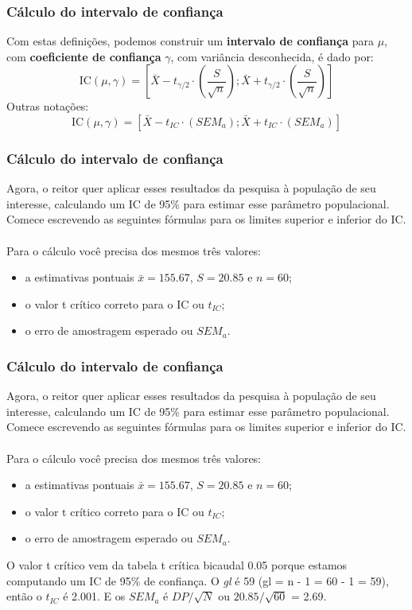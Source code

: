 \documentclass[11pt]{beamer}
\begin{document}
\begin{frame}
\frametitle{Cálculo do intervalo de confiança}

Com estas definições, podemos construir um \textbf{intervalo de
confiança} para \(\mu\), com \textbf{coeficiente de confiança}
\(\gamma\), com variância desconhecida, é dado por: \[
\text{IC}(\mu, \gamma) = \left[ \bar{X} - t_{\gamma/2} \cdot
  \left(\frac{S}{\sqrt{n}}\right) ; \bar{X} + t_{\gamma/2} \cdot
  \left(\frac{S}{\sqrt{n}}\right)  \right]
\]
Outras notações:
\[\text{IC}(\mu, \gamma) = \left[ \bar{X} - t_{IC} \cdot
  \left(SEM_a\right) ; \bar{X} + t_{IC} \cdot
  \left(SEM_a\right)  \right]
\]
\end{frame}

\begin{frame}
\frametitle{Cálculo do intervalo de confiança}

Agora, o reitor quer aplicar esses resultados da pesquisa à população de seu interesse, calculando um IC de 95\% para estimar esse parâmetro populacional. Comece escrevendo as seguintes fórmulas para os limites superior e inferior do IC.\\~\\

Para o cálculo você precisa dos mesmos três valores: 
\begin{itemize}
\item a estimativas pontuais $\bar{x}=155.67$, $S=20.85$ e $n=60$;
\item o valor t crítico correto para o IC ou $t_{IC}$;
\item o erro de amostragem esperado ou $SEM_a$.
\end{itemize}


\end{frame}

\begin{frame}
\frametitle{Cálculo do intervalo de confiança}

Agora, o reitor quer aplicar esses resultados da pesquisa à população de seu interesse, calculando um IC de 95\% para estimar esse parâmetro populacional. Comece escrevendo as seguintes fórmulas para os limites superior e inferior do IC.\\~\\

Para o cálculo você precisa dos mesmos três valores: 
\begin{itemize}
\item a estimativas pontuais $\bar{x}=155.67$, $S=20.85$ e $n=60$;
\item o valor t crítico correto para o IC ou $t_{IC}$;
\item o erro de amostragem esperado ou $SEM_a$.
\end{itemize}

O valor t crítico vem da tabela t crítica bicaudal 0.05 porque estamos computando um IC de 95\% de confiança. O \textit{gl} é 59 (gl = n - 1 = 60 - 1 = 59), então o \(t_{IC}\) é 2.001. E os \(SEM_a\) é \(DP/\sqrt{N}\) ou \(20.85/\sqrt{60}\) = 2.69.

\end{frame}
\end{document}
